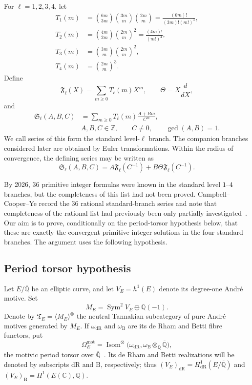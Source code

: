 \documentclass[11pt,a4paper]{amsart} %
\theoremstyle{definition}
\newcommand{\Q}{\mathbb Q}
\newcommand{\Qbar}{\overline{\mathbb Q}}
\newcommand{\C}{\mathbb C}
\newcommand{\Z}{\mathbb Z}
\newcommand{\Sym}{\operatorname{Sym}}
\newcommand{\dR}{\mathrm{dR}}
\newcommand{\Betti}{\mathrm B}
\begin{document}
For \(\ell=1,2,3,4\), let
\[
\begin{aligned}
T_1(m)&=\binom{6m}{3m}\binom{3m}{m}\binom{2m}{m}
      =\frac{(6m)!}{(3m)!(m!)^3},\\
T_2(m)&=\binom{4m}{2m}\binom{2m}{m}^{2}
      =\frac{(4m)!}{(m!)^4},\\
T_3(m)&=\binom{3m}{m}\binom{2m}{m}^{2},\\
T_4(m)&=\binom{2m}{m}^{3}.
\end{aligned}
\]
Define
\[
{\mathfrak F}_\ell(X)=\sum_{m\ge0}T_\ell(m)X^m,\qquad
\Theta=X\frac{d}{dX},
\]
and
\[
\begin{aligned}
{\mathfrak S}_\ell(A,B,C)
&=\sum_{m\ge0}T_\ell(m)\frac{A+Bm}{C^m},\\
&A,B,C\in\Z,\qquad C\ne0,\qquad \gcd(A,B)=1.
\end{aligned}
\]
We call series of this form the standard level-\(\ell\) branch. The companion
branches considered later are obtained by Euler transformations. Within the
radius of convergence, the defining series may be written as
\[
{\mathfrak S}_\ell(A,B,C)
=A {\mathfrak F}_\ell(C^{-1})+B\Theta {\mathfrak F}_\ell(C^{-1}).
\]

By 2026, \(36\) primitive integer formulas were known in the standard
level \(1\)--\(4\) branches, but the completeness of this list had not been
proved. Campbell--Cooper--Ye record the \(36\) rational standard-branch
series and note that completeness of the rational list had previously been
only partially investigated~\cite[Sec.~4.4]{CCY}. Our aim is to prove,
conditionally on the period-torsor hypothesis below, that these are exactly
the convergent primitive integer solutions in the four standard branches.
The argument uses the following hypothesis.

\subsection*{Period torsor hypothesis}

Let \(E/\Qbar\) be an elliptic curve, and let \(V_E=h^1(E)\) denote its
degree-one André motive. Set
\[
M_E=\Sym^2V_E\oplus\Q(-1).
\]
Denote by \(\mathfrak T_E=\langle M_E\rangle^\otimes\) the neutral
Tannakian subcategory of pure André motives generated by \(M_E\).  If
\(\omega_{\dR}\) and \(\omega_{\Betti}\) are its de Rham and Betti fibre
functors, put
\[
\Omega_E^{\mathrm{mot}}
=\operatorname{Isom}^{\otimes}
\bigl(\omega_{\dR},\omega_{\Betti}\otimes_\Q\Qbar\bigr),
\]
the motivic period torsor over \(\Qbar\)~\cite{Andre,BCC}.  Its de Rham
and Betti realizations will be denoted by subscripts \(\dR\) and
\(\Betti\), respectively; thus
\((V_E)_{\dR}=H^1_{\dR}(E/\Qbar)\) and
\((V_E)_{\Betti}=H^1(E(\C),\Q)\).
\end{document}
